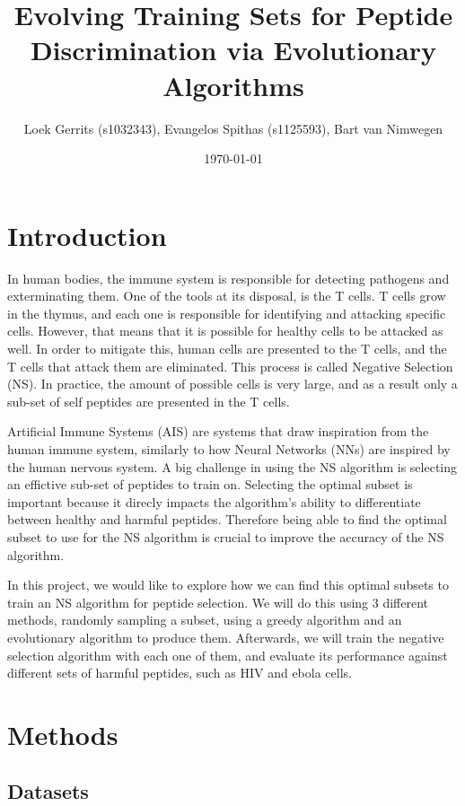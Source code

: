 \documentclass{article}
\title{Evolving Training Sets for Peptide Discrimination via Evolutionary Algorithms}
\author{Loek Gerrits (s1032343), Evangelos Spithas (s1125593), Bart van Nimwegen}
\date{\today}
\begin{document}
 

\maketitle

\section{Introduction}
In human bodies, the immune system is responsible for detecting pathogens and exterminating them. 
One of the tools at its disposal, is the T cells. T cells grow in the thymus, and each one is responsible for
identifying and attacking specific cells. However, that means that it is possible for healthy cells to be
attacked as well. In order to mitigate this, human cells are presented to the T cells, and the T cells that attack them 
are eliminated. This process is called Negative Selection (NS). In practice, the amount of possible cells is very large, and as a result only a sub-set of self peptides are presented
in the T cells. 

Artificial Immune Systems (AIS) are systems that draw inspiration from the human immune system, similarly to how Neural 
Networks (NNs) are inspired by the human nervous system. A big challenge in using the NS algorithm is selecting an effictive sub-set of peptides to train on.
Selecting the optimal subset is important because it direcly impacts the algorithm's ability to differentiate between healthy and harmful peptides.
Therefore being able to find the optimal subset to use for the NS algorithm is crucial to improve the accuracy of the NS algorithm.  

In this project, we would like to explore how we can find this optimal subsets to train an NS algorithm for peptide selection. We will do this using 3 different methods, randomly 
sampling a subset, using a greedy algorithm and an evolutionary algorithm to produce them. Afterwards, we will train the 
negative selection algorithm with each one of them, and evaluate its performance against different sets of harmful 
peptides, such as HIV and ebola cells. 





\section{Methods}

\subsection{Datasets} \label{datasets}
\end{document}
